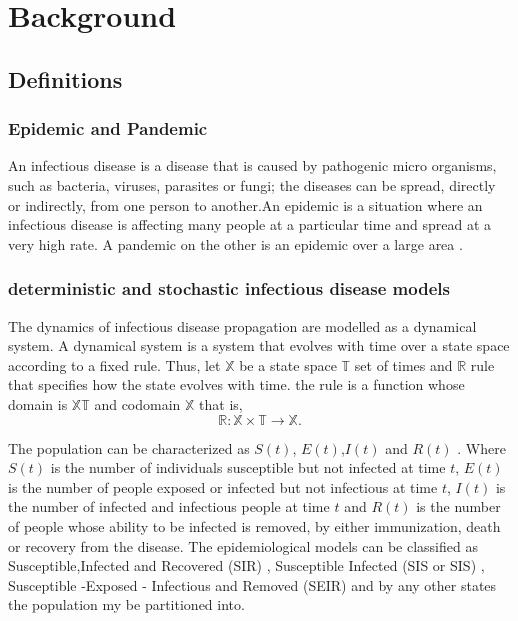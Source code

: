 \chapter{Background}

\section{Definitions}
\subsection{Epidemic and Pandemic }
An infectious disease is a disease that is caused by pathogenic micro organisms, such as bacteria, viruses, parasites or fungi; the diseases can be spread, directly or indirectly, from one person to another.An  epidemic is a situation where an infectious disease is affecting many people at a particular time and spread at a very high rate. A pandemic on the other is an epidemic over a large area \citep{morens2009pandemic}.

\subsection{deterministic and stochastic infectious disease models}
The dynamics of infectious disease propagation are modelled as a dynamical system. A dynamical system is a system that evolves with time over a state space according to a fixed rule. Thus, let $\mathbb{X}$ be a state space $\mathbb{T}$ set of times and $\mathbb{R}$ rule that specifies how the state evolves with time. the rule is a function  whose domain is $\mathbb{X} \mathbb{T}$ and codomain $\mathbb{X}$ that is,
\begin{equation*}
\mathbb{R}: \mathbb{X}  \times \mathbb{T} \longrightarrow \mathbb{X}.
\end{equation*}


The population can be characterized as $S(t)$, $E(t)$,$I(t)$ and $R(t)$ . Where $S(t)$ is the number of individuals susceptible but not infected at time $t$, $E(t)$ is the number of people exposed or infected but not infectious at time $t$, $I(t)$ is the number of infected and infectious people at time $t$ and $R(t)$ is the number of people whose  ability to be infected is removed, by either immunization, death or recovery from the disease. The epidemiological models can be classified as Susceptible,Infected and Recovered (SIR) , Susceptible Infected (SIS or SIS) , Susceptible -Exposed - Infectious and Removed (SEIR)  and by any other states the population my be partitioned into.

